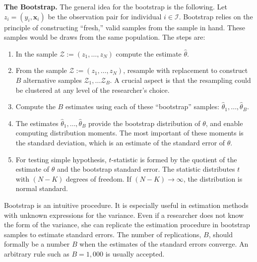 \noindent \textbf{The Bootstrap.} The general idea for the bootstrap is the following. Let $z_i = \left( y_i, \bm{x}_i \right)$ be the observation pair for individual $i \in \mathcal{I}$. Bootstrap relies on the principle of constructing ``fresh,'' valid samples from the sample in hand. These samples would be draws from the same population. The steps are: 
\begin{enumerate}
	\item In the sample $\mathcal{Z} := \left( z_1, \ldots, z_N \right)$ compute the estimate $\hat{\theta}$. 
	\item From the sample $\mathcal{Z} := \left( z_1, \ldots, z_N \right)$, resample with replacement to construct $B$ alternative samples $\mathcal{Z}_{1}, \ldots \mathcal{Z}_{B}$. A crucial aspect is that the resampling could be clustered at any level of the researcher's choice.  
	\item Compute the $B$ estimates using each of these ``bootstrap'' samples: $\hat{\theta}_1, \ldots, \hat{\theta}_B$. 	
	\item The estimates $\hat{\theta}_1, \ldots, \hat{\theta}_B$ provide the bootstrap distribution of $\theta$, and enable computing distribution moments. The most important of these moments is the standard deviation, which is an estimate of the standard error of $\theta$. 
	\item For testing simple hypothesis, $t$-statistic is formed by the quotient of the estimate of $\theta$ and the bootstrap standard error. The statistic distributes $t$ with $\left( N-K \right)$ degrees of freedom. If $\left( N-K \right) \rightarrow \infty$, the distribution is normal standard.
\end{enumerate}  

\noindent Bootstrap is an intuitive procedure. It is especially useful in estimation methods with unknown expressions for the variance. Even if a researcher does not know the form of the variance, she can replicate the estimation procedure in bootstrap samples to estimate standard errors. The number of replications, $B$, should formally be a number $B$ when the estimates of the standard errors converge. An arbitrary rule such as $B = 1,000$ is usually accepted.\\

